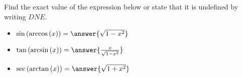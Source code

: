 \documentclass{ximera}
\author{Nela Lakos \and Kyle Parsons}
\begin{document}
\begin{exercise}

Find the exact value of the expression below or state that it is undefined by writing $DNE$.

\begin{itemize}
\item $\sin\left(\arccos\left(x\right)\right) = \answer{\sqrt{1-x^2}}$
\item $\tan\left(\arcsin\left(x\right)\right) = \answer{\frac{x}{\sqrt{1-x^2}}}$
\item $\sec\left(\arctan\left(x\right)\right) = \answer{\sqrt{1+x^2}}$

\end{itemize}

\end{exercise}
\end{document}
